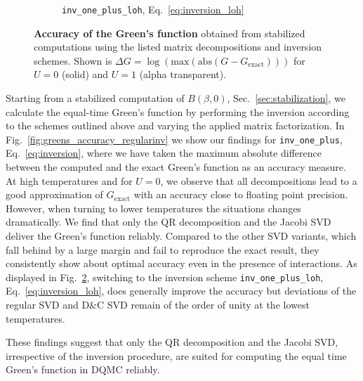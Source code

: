 \documentclass[submission, Phys]{SciPost}
\begin{document}
\begin{figure}
\begin{subfigure}{0.48\textwidth}
\caption{\texttt{inv\_one\_plus\_loh}, Eq.~\ref{eq:inversion_loh} \label{fig:greens_accuracy_loh}}
	\end{subfigure}
	\vspace{5pt}
	\caption{\textbf{Accuracy of the Green's function} obtained from stabilized computations using the listed matrix decompositions and inversion schemes. Shown is ${\Delta G = \log(\textrm{max}(\textrm{abs}(G - G_{\textrm{exact}})))}$ for $U=0$ (solid) and $U=1$ (alpha transparent).}
\end{figure}

Starting from a stabilized computation of $B(\beta,0)$, Sec.~\ref{sec:stabilization}, we calculate the equal-time Green's function by performing the inversion according to the schemes outlined above and varying the applied matrix factorization. In Fig.~\ref{fig:greens_accuracy_regularinv} we show our findings for \texttt{inv\_one\_plus}, Eq.~\ref{eq:inversion}, where we have taken the maximum absolute difference between the computed and the exact Green's function as an accuracy measure. At high temperatures and for $U=0$, we observe that all decompositions lead to a good approximation of $G_{\textrm{exact}}$ with an accuracy close to floating point precision. However, when turning to lower temperatures the situations changes dramatically. We find that only the QR decomposition and the Jacobi SVD deliver the Green's function reliably. Compared to the other SVD variants, which fall behind by a large margin and fail to reproduce the exact result, they consistently show about optimal accuracy even in the presence of interactions. As displayed in Fig.~\ref{fig:greens_accuracy_loh}, switching to the inversion scheme \texttt{inv\_one\_plus\_loh}, Eq.~\ref{eq:inversion_loh}, does generally improve the accuracy but deviations of the regular SVD and D\&C SVD remain of the order of unity at the lowest temperatures.

These findings suggest that only the QR decomposition and the Jacobi SVD, irrespective of the inversion procedure, are suited for computing the equal time Green's function in DQMC reliably.
\end{document}
